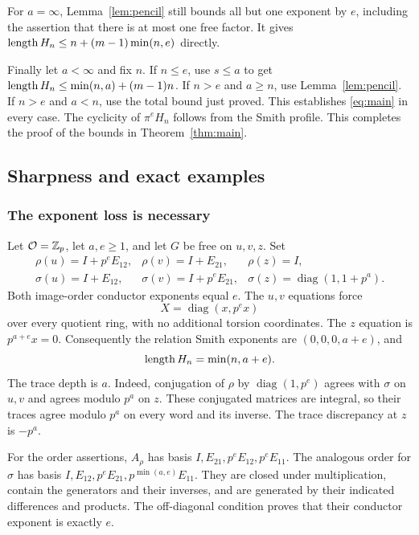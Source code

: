 For $a=\infty$, Lemma~\ref{lem:pencil} still bounds all but one
exponent by $e$, including the assertion that there is at most one free
factor. It gives $\operatorname{length} H_n\le n+(m-1)\min(n,e)$ directly.

Finally let $a<\infty$ and fix $n$. If $n\le e$, use $s\le a$ to get
$\operatorname{length} H_n\le\min(n,a)+(m-1)n$. If $n>e$ and $a\ge n$, use
Lemma~\ref{lem:pencil}. If $n>e$ and $a<n$, use the total bound just
proved. This establishes \eqref{eq:main} in every case. The cyclicity of
$\pi^eH_n$ follows from the Smith profile. This completes the proof of
the bounds in Theorem~\ref{thm:main}.

\subsection{Sharpness and exact examples}

\subsubsection{The exponent loss is necessary}

\begin{example}\label{ex:exponent}
Let $\mathcal O=\mathbb Z_p$, let $a,e\ge1$, and let $G$ be free on $u,v,z$.
Set
\[
\begin{array}{lll}
 \rho(u)=I+p^eE_{12},&\rho(v)=I+E_{21},&\rho(z)=I,\\
 \sigma(u)=I+E_{12},&\sigma(v)=I+p^eE_{21},&
 \sigma(z)=\operatorname{diag}(1,1+p^a).
\end{array}
\]
Both image-order conductor exponents equal $e$. The $u,v$ equations force
\[
 X=\operatorname{diag}(x,p^ex)
\]
over every quotient ring, with no additional torsion coordinates. The
$z$ equation is $p^{a+e}x=0$. Consequently the relation Smith exponents are
$(0,0,0,a+e)$, and
\[
 \operatorname{length} H_n=\min(n,a+e).
\]
The trace depth is $a$. Indeed, conjugation of $\rho$ by
$\operatorname{diag}(1,p^e)$ agrees with $\sigma$ on $u,v$ and agrees
modulo $p^a$ on $z$. These conjugated matrices are integral, so their
traces agree modulo $p^a$ on every word and its inverse. The trace
discrepancy at $z$ is $-p^a$.

For the order assertions, $A_\rho$ has basis
$I,E_{21},p^eE_{12},p^eE_{11}$. The analogous order for $\sigma$ has basis
$I,E_{12},p^eE_{21},p^{\min(a,e)}E_{11}$. They are closed under
multiplication, contain the generators and their inverses, and are
generated by their indicated differences and products. The off-diagonal
condition proves that their conductor exponent is exactly $e$.
\end{example}


